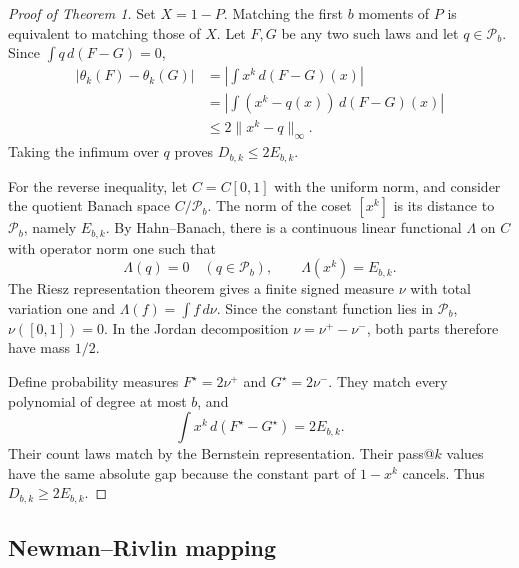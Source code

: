 \documentclass[twoside]{article}
\newcommand{\Pcal}{\mathcal P}
\begin{document}
\begin{proof}[Proof of Theorem 1]
Set \(X=1-P\). Matching the first \(b\) moments of \(P\) is equivalent to
matching those of \(X\). Let \(F,G\) be any two such laws and let
\(q\in\Pcal_b\). Since \(\int q\,d(F-G)=0\),
\begin{align*}
\left|\theta_k(F)-\theta_k(G)\right|
&=\left|\int x^k\,d(F-G)(x)\right|\\
&=\left|\int(x^k-q(x))\,d(F-G)(x)\right|\\
&\leq 2\|x^k-q\|_\infty.
\end{align*}
Taking the infimum over \(q\) proves \(D_{b,k}\leq2E_{b,k}\).

For the reverse inequality, let \(C=C[0,1]\) with the uniform norm, and
consider the quotient Banach space \(C/\Pcal_b\). The norm of the coset
\([x^k]\) is its distance to \(\Pcal_b\), namely \(E_{b,k}\). By
Hahn--Banach, there is a continuous linear functional \(\Lambda\) on \(C\)
with operator norm one such that
\[
 \Lambda(q)=0\quad(q\in\Pcal_b),\qquad
 \Lambda(x^k)=E_{b,k}.
\]
The Riesz representation theorem gives a finite signed measure \(\nu\) with
total variation one and \(\Lambda(f)=\int f\,d\nu\). Since the constant
function lies in \(\Pcal_b\), \(\nu([0,1])=0\). In the Jordan decomposition
\(\nu=\nu^+-\nu^-\), both parts therefore have mass \(1/2\).

Define probability measures \(F^\star=2\nu^+\) and
\(G^\star=2\nu^-\). They match every polynomial of degree at most \(b\), and
\[
 \int x^k\,d(F^\star-G^\star)=2E_{b,k}.
\]
Their count laws match by the Bernstein representation. Their pass@\(k\)
values have the same absolute gap because the constant part of
\(1-x^k\) cancels. Thus \(D_{b,k}\geq2E_{b,k}\).
\end{proof}

\subsection{Newman--Rivlin mapping}
\end{document}
